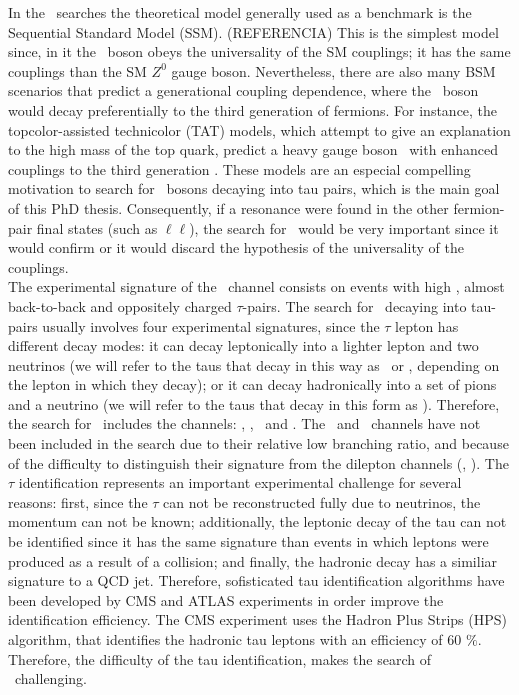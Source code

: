 In the \Zprime~searches the theoretical model generally used as a benchmark is the Sequential Standard Model (SSM). (REFERENCIA)
This is the simplest model since, in it the \Zprime~boson obeys the 
universality of the SM couplings; it has the same couplings than the SM $Z^{0}$ gauge boson. Nevertheless, there are 
also many BSM scenarios that predict a generational coupling dependence, where the \Zprime~boson 
would decay preferentially to the third generation of fermions. For instance, 
the topcolor-assisted technicolor (TAT) models, which attempt to give an explanation to the high mass of the top quark,
predict a heavy gauge boson \ZprimeTAT~with enhanced couplings to the third generation \cite{Langacker:2008yv}. These models 
are an especial compelling motivation to search for \Zprime~bosons decaying into tau pairs, which is the main goal of this PhD 
thesis. Consequently, if a resonance were found in the other fermion-pair final states (such as $\ell\ell$), the search for 
\Zprimetotautau~would be very important since it would confirm or it would discard 
the hypothesis of the universality of the couplings. \\

The experimental signature of the \Zprimetotautau~channel consists on events with high \pt, almost
back-to-back and oppositely charged $\tau$-pairs. The search for \Zprime~decaying into tau-pairs 
usually involves four experimental signatures, since the $\tau$ lepton has different decay modes: it 
can decay leptonically into a lighter lepton and two neutrinos (we will refer to the taus that decay in 
this way as \taue~or \taumu, depending on the lepton in which they decay); 
or it can decay hadronically into a set of pions and a neutrino (we will refer to the taus that decay in this form
as \tauh). Therefore, the search for \Zprimetotautau~includes 
the channels: \taue\tauh, \taumu\tauh, \taue\taumu~and \tauh\tauh. The \taue\taue~and \taumu\taumu~channels
have not been included in the search due to their relative low branching ratio, and because of the difficulty to
distinguish their signature from the dilepton channels (\Zprimetomumu, \Zprimetoee). The $\tau$ 
identification represents an important experimental challenge for several reasons: first, since 
the $\tau$ can not be reconstructed fully due to neutrinos, the momentum can not be known; additionally, the leptonic decay of 
the tau can not be identified since it has the same signature than events in which leptons were produced as a result of 
a collision; and finally, the hadronic decay has a similiar signature to a QCD jet. Therefore, sofisticated tau 
identification algorithms have been developed by CMS and ATLAS experiments in order improve the identification 
efficiency. The CMS experiment uses the Hadron Plus Strips (HPS) algorithm, that 
identifies the hadronic tau leptons with an efficiency of 60 $\%$. Therefore, the difficulty of the tau 
identification, makes the search of \Zprimetotautau~challenging. \\

